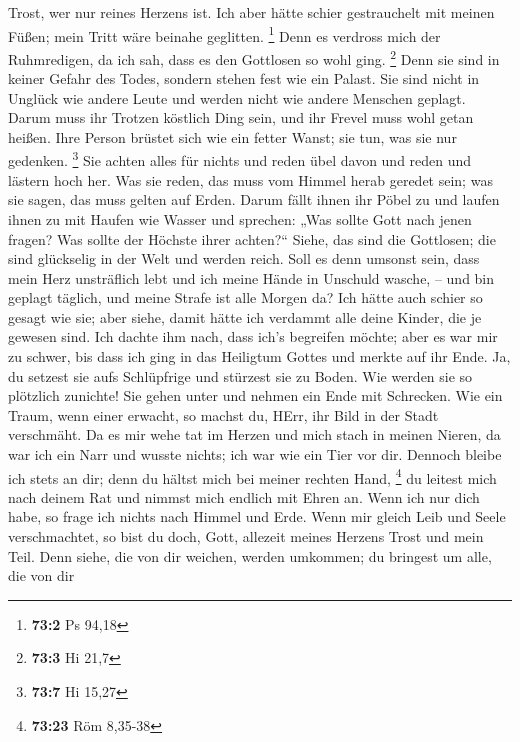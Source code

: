 Trost, wer nur reines Herzens ist.  Ich aber hätte schier
gestrauchelt mit meinen Füßen; mein Tritt wäre beinahe geglitten.
\footnote{\textbf{73:2} Ps 94,18}  Denn es verdross mich der
Ruhmredigen, da ich sah, dass es den Gottlosen so wohl ging. \footnote{\textbf{73:3}
  Hi 21,7}  Denn sie sind in keiner Gefahr des Todes,
sondern stehen fest wie ein Palast.  Sie sind nicht in
Unglück wie andere Leute und werden nicht wie andere Menschen geplagt.
 Darum muss ihr Trotzen köstlich Ding sein, und ihr Frevel
muss wohl getan heißen.  Ihre Person brüstet sich wie ein
fetter Wanst; sie tun, was sie nur gedenken. \footnote{\textbf{73:7} Hi
  15,27}  Sie achten alles für nichts und reden übel davon
und reden und lästern hoch her.  Was sie reden, das muss vom
Himmel herab geredet sein; was sie sagen, das muss gelten auf Erden.
 Darum fällt ihnen ihr Pöbel zu und laufen ihnen zu mit
Haufen wie Wasser  und sprechen: „Was sollte Gott nach
jenen fragen? Was sollte der Höchste ihrer achten?{}`` 
Siehe, das sind die Gottlosen; die sind glückselig in der Welt und
werden reich.  Soll es denn umsonst sein, dass mein Herz
unsträflich lebt und ich meine Hände in Unschuld wasche, --
 und bin geplagt täglich, und meine Strafe ist alle Morgen
da?  Ich hätte auch schier so gesagt wie sie; aber siehe,
damit hätte ich verdammt alle deine Kinder, die je gewesen sind.
 Ich dachte ihm nach, dass ich's begreifen möchte; aber es
war mir zu schwer,  bis dass ich ging in das Heiligtum
Gottes und merkte auf ihr Ende.  Ja, du setzest sie aufs
Schlüpfrige und stürzest sie zu Boden.  Wie werden sie so
plötzlich zunichte! Sie gehen unter und nehmen ein Ende mit Schrecken.
 Wie ein Traum, wenn einer erwacht, so machst du, HErr, ihr
Bild in der Stadt verschmäht.  Da es mir wehe tat im Herzen
und mich stach in meinen Nieren,  da war ich ein Narr und
wusste nichts; ich war wie ein Tier vor dir.  Dennoch
bleibe ich stets an dir; denn du hältst mich bei meiner rechten Hand,
\footnote{\textbf{73:23} Röm 8,35-38}  du leitest mich nach
deinem Rat und nimmst mich endlich mit Ehren an.  Wenn ich
nur dich habe, so frage ich nichts nach Himmel und Erde. 
Wenn mir gleich Leib und Seele verschmachtet, so bist du doch, Gott,
allezeit meines Herzens Trost und mein Teil.  Denn siehe,
die von dir weichen, werden umkommen; du bringest um alle, die von dir
